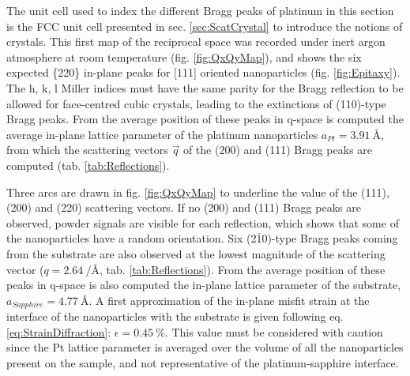 The unit cell used to index the different Bragg peaks of platinum in this section is the FCC unit cell presented in sec. \ref{sec:ScatCrystal} to introduce the notions of crystals.
This first map of the reciprocal space was recorded under inert argon atmosphere at room temperature (fig. \ref{fig:QxQyMap}), and shows the six expected \{220\} in-plane peaks for [111] oriented nanoparticles (fig. \ref{fig:Epitaxy}).
The h, k, l Miller indices must have the same parity for the Bragg reflection to be allowed for face-centred cubic crystals, leading to the extinctions of (110)-type Bragg peaks.
From the average position of these peaks in q-space is computed the average in-plane lattice parameter of the platinum nanoparticles $a_{Pt}=\qty{3.91}{\angstrom}$, from which the scattering vectors $\vec{q}$ of the (200) and (111) Bragg peaks are computed (tab. \ref{tab:Reflections}).

Three arcs are drawn in fig. \ref{fig:QxQyMap} to underline the value of the (111), (200) and (220) scattering vectors.
If no (200) and (111) Bragg peaks are observed, powder signals are visible for each reflection, which shows that some of the nanoparticles have a random orientation.
Six (2$\bar{1}$0)-type Bragg peaks coming from the  substrate are also observed at the lowest magnitude of the scattering vector ($q = \qty{2.64}{\per\angstrom}$, tab. \ref{tab:Reflections}).
From the average position of these peaks in q-space is also computed the in-plane lattice parameter of the substrate, $a_{Sapphire}=\qty{4.77}{\angstrom}$.
A first approximation of the in-plane misfit strain at the interface of the nanoparticles with the substrate is given following eq. \ref{eq:StrainDiffraction}: $\epsilon = \qty{0.45}{\percent}$.
This value must be considered with caution since the Pt lattice parameter is averaged over the volume of all the nanoparticles present on the sample, and not representative of the platinum-sapphire interface.

